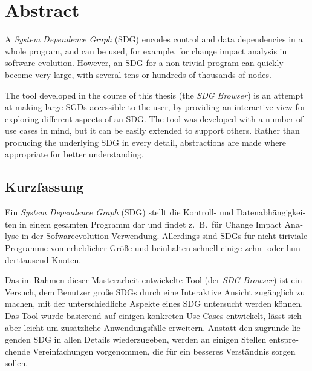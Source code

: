 \chapter*{Abstract} \vspace{-0.5cm}

A \emph{System Dependence Graph} (SDG) encodes control and data dependencies in a whole program, and can be used, for 
example, for change impact analysis in software evolution. However, an SDG for a non-trivial program can quickly become 
very large, with several tens or hundreds of thousands of nodes.

The tool developed in the course of this thesis (the \emph{SDG Browser}) is an attempt at making large SGDs accessible 
to the user, by providing an interactive view for exploring different aspects of an SDG. The tool was developed with a 
number of use cases in mind, but it can be easily extended to support others. Rather than producing the underlying SDG 
in every detail, abstractions are made where appropriate for better understanding.


\begin{otherlanguage}{ngerman}
\begingroup
\let\clearpage\relax
\chapter*{Kurzfassung} \vspace{-0.5cm}
\endgroup

Ein \emph{System Dependence Graph} (SDG) stellt die Kontroll- und Datenabhängigkeiten in einem gesamten Programm dar 
und findet z.\ B.\ für Change Impact Analyse in der Sofwareevolution Verwendung. Allerdings sind SDGs für 
nicht-tiriviale Programme von erheblicher Größe und beinhalten schnell einige zehn- oder hunderttausend Knoten.

Das im Rahmen dieser Masterarbeit entwickelte Tool (der \emph{SDG Browser}) ist ein Versuch, dem Benutzer große SDGs 
durch eine Interaktive Ansicht zugänglich zu machen, mit der unterschiedliche Aspekte eines SDG untersucht werden 
können. Das Tool wurde basierend auf einigen konkreten Use Cases entwickelt, lässt sich aber leicht um zusätzliche 
Anwendungsfälle erweitern. Anstatt den zugrunde liegenden SDG in allen Details wiederzugeben, werden an einigen Stellen 
entsprechende Vereinfachungen vorgenommen, die für ein besseres Verständnis sorgen sollen.

\end{otherlanguage}

